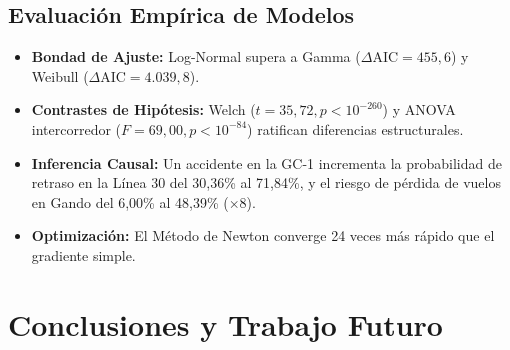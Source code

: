 \documentclass[11pt,a4paper,twoside]{report}
\begin{document}
\section{Evaluación Empírica de Modelos}
\begin{itemize}
    \item \textbf{Bondad de Ajuste:} Log-Normal supera a Gamma ($\Delta \text{AIC} = 455,6$) y Weibull ($\Delta \text{AIC} = 4.039,8$).
    \item \textbf{Contrastes de Hipótesis:} Welch ($t = 35,72, p < 10^{-260}$) y ANOVA intercorredor ($F = 69,00, p < 10^{-84}$) ratifican diferencias estructurales.
    \item \textbf{Inferencia Causal:} Un accidente en la GC-1 incrementa la probabilidad de retraso en la Línea 30 del 30,36\% al 71,84\%, y el riesgo de pérdida de vuelos en Gando del 6,00\% al 48,39\% ($\times 8$).
    \item \textbf{Optimización:} El Método de Newton converge 24 veces más rápido que el gradiente simple.
\end{itemize}

\chapter{Conclusiones y Trabajo Futuro}
\end{document}
